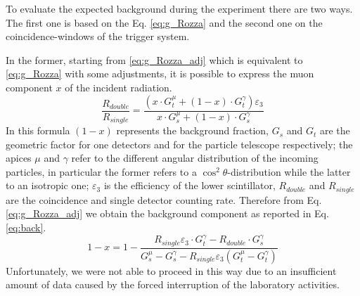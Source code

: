 \label{Background}

To evaluate the expected background during the experiment there are two ways. The first one is based on the Eq. \eqref{eq:g_Rozza} and the second one on the coincidence-windows of the trigger system.

In the former, starting from \eqref{eq:g_Rozza_adj} which is equivalent to \eqref{eq:g_Rozza} with some adjustments, it is possible to express the muon component $x$ of the incident radiation.
\begin{equation}\label{eq:g_Rozza_adj}
	\frac{R_{double}}{R_{single}} = \frac{\left(x\cdot G_t^\mu + \left(1 - x \right)\cdot G_t^\gamma \right)\varepsilon_3}{x\cdot G_s^\mu + \left(1 - x \right)\cdot G_s^\gamma}
\end{equation}
In this formula $\left( 1 - x\right) $ represents the background fraction, $G_s$ and $G_t$ are the geometric factor for one detectors and for the particle telescope respectively; the apices $\mu$ and $\gamma$ refer to the different angular distribution of the incoming particles, in particular the former refers to a $\cos^2\theta$-distribution while the latter to an isotropic one; $\varepsilon_3$ is the efficiency of the lower scintillator, $R_{double}$ and $R_{single}$ are the coincidence and single detector counting rate. Therefore from Eq. \eqref{eq:g_Rozza_adj} we obtain the background component as reported in Eq. \eqref{eq:back}.
\begin{equation}\label{eq:back}
	1 - x = 1 - \frac{R_{single}\varepsilon_3\cdot G_t^\gamma - R_{double}\cdot G_s^\gamma}{G_s^\mu - G_s^\gamma - R_{single}\varepsilon_3\left( G_t^\mu - G_t^\gamma\right)}
\end{equation}
Unfortunately, we were not able to proceed in this way due to an insufficient amount of data caused by the forced interruption of the laboratory activities. \\

